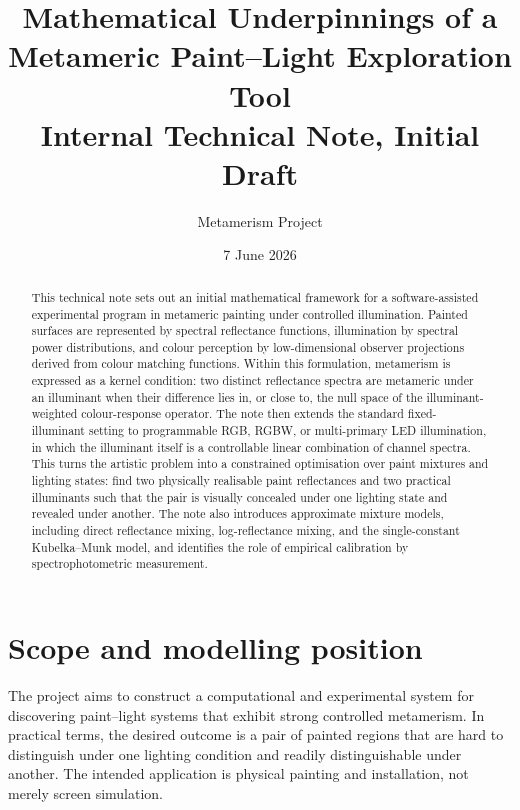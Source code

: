 \documentclass[11pt,a4paper]{article}
\title{Mathematical Underpinnings of a Metameric Paint--Light Exploration Tool\\
\large Internal Technical Note, Initial Draft}
\author{Metamerism Project}
\date{7 June 2026}
\begin{document}
\maketitle

\begin{abstract}
This technical note sets out an initial mathematical framework for a software-assisted experimental program in metameric painting under controlled illumination. Painted surfaces are represented by spectral reflectance functions, illumination by spectral power distributions, and colour perception by low-dimensional observer projections derived from colour matching functions. Within this formulation, metamerism is expressed as a kernel condition: two distinct reflectance spectra are metameric under an illuminant when their difference lies in, or close to, the null space of the illuminant-weighted colour-response operator. The note then extends the standard fixed-illuminant setting to programmable RGB, RGBW, or multi-primary LED illumination, in which the illuminant itself is a controllable linear combination of channel spectra. This turns the artistic problem into a constrained optimisation over paint mixtures and lighting states: find two physically realisable paint reflectances and two practical illuminants such that the pair is visually concealed under one lighting state and revealed under another. The note also introduces approximate mixture models, including direct reflectance mixing, log-reflectance mixing, and the single-constant Kubelka--Munk model, and identifies the role of empirical calibration by spectrophotometric measurement.
\end{abstract}

\tableofcontents
\newpage

\section{Scope and modelling position}

The project aims to construct a computational and experimental system for discovering paint--light systems that exhibit strong controlled metamerism. In practical terms, the desired outcome is a pair of painted regions that are hard to distinguish under one lighting condition and readily distinguishable under another. The intended application is physical painting and installation, not merely screen simulation.
\end{document}
